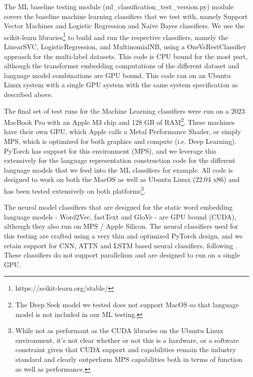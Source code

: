 \documentclass[final]{clv2025}
\begin{document}
The ML baseline testing module (ml\_classification\_test\_version.py) module covers the baseline machine learning classifiers that we test with, namely Support Vector Machines and Logistic Regression and Naïve Bayes classifiers. We use the scikit-learn libraries\footnote{https://scikit-learn.org/stable/} to build and run the respective classifiers, namely the LinearSVC, LogisticRegression, and MultinomialNB, using a OneVsRestClassifier approach for the multi-label datasets. This code is CPU bound for the most part, although the transformer embedding computations of the different dataset and language model combinations are GPU bound. This code ran on an Ubuntu Linux system with a single GPU system with the same system specification as described above.

The final set of test runs for the Machine Learning classifiers were run on a 2023 MacBook Pro with an Apple M3 chip and 128 GB of RAM\footnote{The Deep Seek model we tested does not support MacOS so that language model is not included in our ML testing.}. These machines have their own GPU, which Apple calls a Metal Performance Shader, or simply MPS, which is optimized for both graphics and compute (i.e. Deep Learning). PyTorch has support for this environment (MPS), and we leverage this extensively for the language representation construction code for the different language models that we feed into the ML classifiers for example. All code is designed to work on both the MacOS as well as Ubuntu Linux (22.04 x86) and has been tested extensively on both platforms\footnote{  While not as performant as the CUDA libraries on the Ubuntu Linux environment, it’s not clear whether or not this is a hardware, or a software constraint given that CUDA support and capabilities remain the industry standard and clearly outperform MPS capabilities both in terms of function as well as performance.}. 

The neural model classifiers that are designed for the static word embedding language models - Word2Vec, fastText and GloVe - are GPU bound (CUDA), although they also run on MPS / Apple Silicon. The neural classifiers used for this testing are crafted using a very thin and optimized PyTorch design, and we retain support for CNN, ATTN and LSTM based neural classifiers, following \cite{moreo}. These classifiers do not support parallelism and are designed to run on a single GPU. 
\end{document}

